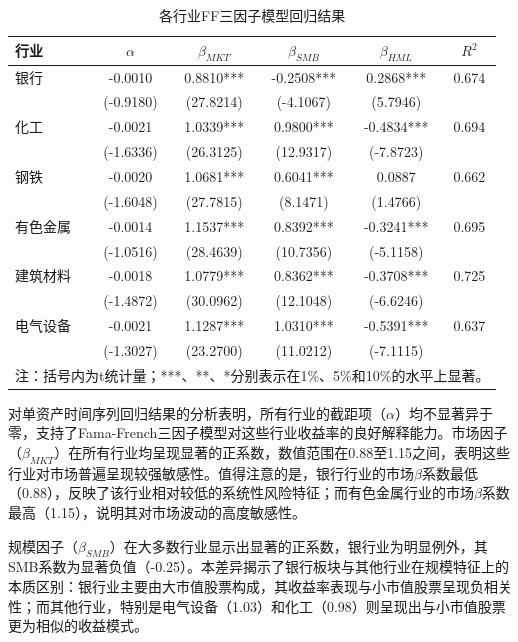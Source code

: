 \documentclass[12pt, a4paper]{article}
\begin{document}
\begin{table}[htbp]
\centering
\caption{各行业FF三因子模型回归结果}
\label{tab:ff_single_test}
\begin{tabular}{lccccc}
\toprule
行业 & $\alpha$ & $\beta_{MKT}$ & $\beta_{SMB}$ & $\beta_{HML}$ & $R^2$ \\
\midrule
银行 & -0.0010 & 0.8810*** & -0.2508*** & 0.2868*** & 0.674 \\
 & (-0.9180) & (27.8214) & (-4.1067) & (5.7946) & \\
化工 & -0.0021 & 1.0339*** & 0.9800*** & -0.4834*** & 0.694 \\
 & (-1.6336) & (26.3125) & (12.9317) & (-7.8723) & \\
钢铁 & -0.0020 & 1.0681*** & 0.6041*** & 0.0887 & 0.662 \\
 & (-1.6048) & (27.7815) & (8.1471) & (1.4766) & \\
有色金属 & -0.0014 & 1.1537*** & 0.8392*** & -0.3241*** & 0.695 \\
 & (-1.0516) & (28.4639) & (10.7356) & (-5.1158) & \\
建筑材料 & -0.0018 & 1.0779*** & 0.8362*** & -0.3708*** & 0.725 \\
 & (-1.4872) & (30.0962) & (12.1048) & (-6.6246) & \\
电气设备 & -0.0021 & 1.1287*** & 1.0310*** & -0.5391*** & 0.637 \\
 & (-1.3027) & (23.2700) & (11.0212) & (-7.1115) & \\
\bottomrule
\multicolumn{6}{l}{\scriptsize 注：括号内为t统计量；***、**、*分别表示在1\%、5\%和10\%的水平上显著。}
\end{tabular}
\end{table}

对单资产时间序列回归结果的分析表明，所有行业的截距项（$\alpha$）均不显著异于零，支持了Fama-French三因子模型对这些行业收益率的良好解释能力。市场因子（$\beta_{MKT}$）在所有行业均呈现显著的正系数，数值范围在0.88至1.15之间，表明这些行业对市场普遍呈现较强敏感性。值得注意的是，银行行业的市场$\beta$系数最低（0.88），反映了该行业相对较低的系统性风险特征；而有色金属行业的市场$\beta$系数最高（1.15），说明其对市场波动的高度敏感性。

规模因子（$\beta_{SMB}$）在大多数行业显示出显著的正系数，银行业为明显例外，其SMB系数为显著负值（-0.25）。本差异揭示了银行板块与其他行业在规模特征上的本质区别：银行业主要由大市值股票构成，其收益率表现与小市值股票呈现负相关性；而其他行业，特别是电气设备（1.03）和化工（0.98）则呈现出与小市值股票更为相似的收益模式。
\end{document}
